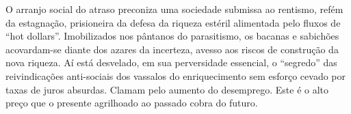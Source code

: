 O arranjo social do atraso preconiza uma sociedade submissa ao rentismo,
refém da estagnação, prisioneira da defesa da riqueza estéril alimentada
pelo fluxos de ``hot dollars''. Imobilizados nos pântanos do
parasitismo, os bacanas e sabichões acovardam-se diante dos azares da
incerteza, avesso aos riscos de construção da nova riqueza. Aí está
desvelado, em sua perversidade essencial, o ``segredo'' das
reivindicações anti-sociais dos vassalos do enriquecimento sem esforço
cevado por taxas de juros absurdas. Clamam pelo aumento do desemprego.
Este é o alto preço que o presente agrilhoado ao passado cobra do
futuro.
